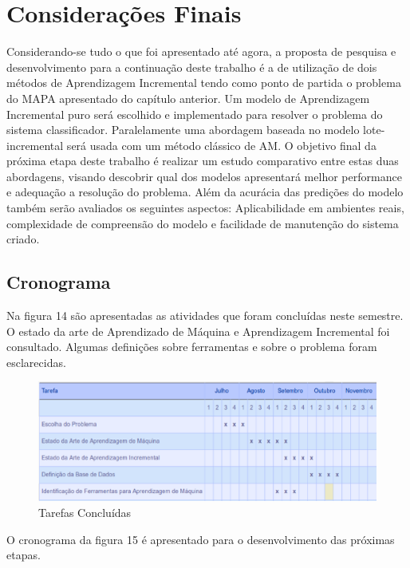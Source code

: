 \chapter{Considerações Finais}

Considerando-se tudo o que foi apresentado até agora, a proposta de pesquisa e desenvolvimento para a continuação deste trabalho é a de utilização de dois métodos de Aprendizagem Incremental tendo como ponto de partida o problema do MAPA apresentado do capítulo anterior. Um modelo de Aprendizagem Incremental puro será escolhido e implementado para resolver o problema do sistema classificador. Paralelamente uma abordagem baseada no modelo lote-incremental será usada com um método clássico de AM. O objetivo final da próxima etapa deste trabalho é realizar um estudo comparativo entre estas duas abordagens, visando descobrir qual dos modelos apresentará melhor performance e adequação a resolução do problema. Além da acurácia das predições do modelo também serão avaliados os seguintes aspectos: Aplicabilidade em ambientes reais, complexidade de compreensão do modelo e facilidade de manutenção do sistema criado.

\section{Cronograma}
Na figura 14 são apresentadas as atividades que foram concluídas neste semestre. O estado da arte de Aprendizado de Máquina e Aprendizagem Incremental foi consultado. Algumas definições sobre ferramentas e sobre o problema foram esclarecidas.

\begin{figure}[!h]
\centering
\includegraphics[keepaspectratio=true,scale=0.50]
{figuras/cronogramaPassado.eps}
\caption{Tarefas Concluídas}
\label{cronogramaPassado}
\end{figure}

O cronograma da figura 15 é apresentado para o desenvolvimento das próximas etapas. 

